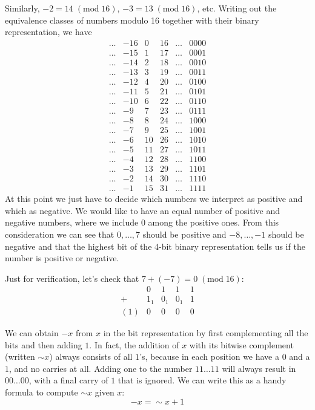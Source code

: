 \begin{example}
Similarly, $-2 = 14\;(\mathrm{mod}\;16)$, $-3 =
13\;(\mathrm{mod}\;16)$, etc.  Writing out the equivalence classes
of numbers modulo 16 together with their binary representation, we
have
$$
\begin{array}{crrrcl}
   \ldots & -16 &  0 & 16 & \ldots & 0000
\\ \ldots & -15 &  1 & 17 & \ldots & 0001
\\ \ldots & -14 &  2 & 18 & \ldots & 0010
\\ \ldots & -13 &  3 & 19 & \ldots & 0011
\\ \ldots & -12 &  4 & 20 & \ldots & 0100
\\ \ldots & -11 &  5 & 21 & \ldots & 0101
\\ \ldots & -10 &  6 & 22 & \ldots & 0110
\\ \ldots & -9  &  7 & 23 & \ldots & 0111
\\ \ldots & -8  &  8 & 24 & \ldots & 1000
\\ \ldots & -7  &  9 & 25 & \ldots & 1001
\\ \ldots & -6  & 10 & 26 & \ldots & 1010
\\ \ldots & -5  & 11 & 27 & \ldots & 1011
\\ \ldots & -4  & 12 & 28 & \ldots & 1100
\\ \ldots & -3  & 13 & 29 & \ldots & 1101
\\ \ldots & -2  & 14 & 30 & \ldots & 1110
\\ \ldots & -1  & 15 & 31 & \ldots & 1111
\end{array}
$$
At this point we just have to decide which numbers we interpret as
positive and which as negative.  We would like to have an equal number
of positive and negative numbers, where we include 0 among the
positive ones.  From this consideration we can see that $0, \ldots,
7$ should be positive and $-8, \ldots, -1$ should be negative and that
the highest bit of the 4-bit binary representation tells us if the
number is positive or negative.
\end{example}

Just for verification, let's check that $7+(-7) = 0 \;(\mathrm{mod}\;16)$:
$$
\begin{array}{cllll}
       & 0   & 1   & 1   & 1
\\   + & 1_1 & 0_1 & 0_1 & 1
\\\hline
   (1) & 0   & 0   & 0   & 0
\end{array}
$$

We can obtain $-x$ from $x$ in the bit
representation by first complementing all the bits and then adding
$1$.  In fact, the addition of $x$ with its bitwise complement
(written ${\sim}x$) always consists of all $1$'s, because in each
position we have a $0$ and a $1$, and no carries at all.  Adding one
to the number $11\ldots11$ will always result in $00\ldots00$, with a
final carry of $1$ that is ignored.  We can write this as a handy
formula to compute ${\sim}x$ given $x$:
$$
-x = {\sim}x + 1
$$

